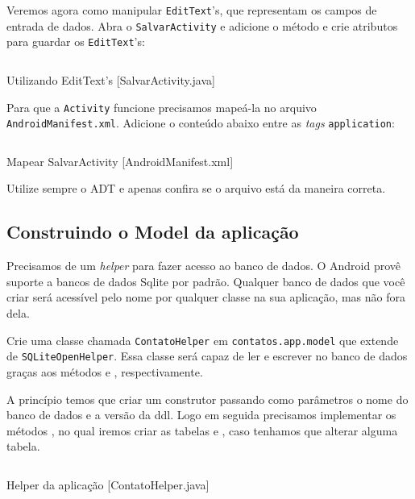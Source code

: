 Veremos agora como manipular \texttt{EditText}'s, que representam os campos de entrada de dados. Abra o
\texttt{SalvarActivity} e adicione o método  e crie atributos para guardar os \texttt{EditText}'s:

\begin{listing}[H]
  \inputminted[linenos=true,frame=bottomline,tabsize=3]{ java }{ source/SalvarActivity-1.java }
  \caption{Utilizando EditText's [SalvarActivity.java]}
\end{listing}

Para que a \texttt{Activity} funcione precisamos mapeá-la no arquivo \texttt{AndroidManifest.xml}. Adicione o
conteúdo abaixo entre as \textit{tags} \texttt{application}:

\begin{listing}[H]
  \inputminted[linenos=true,frame=bottomline,tabsize=3]{ xml }{ source/AndroidManifest-2.xml }
  \caption{Mapear SalvarActivity [AndroidManifest.xml]}
\end{listing}

Utilize sempre o ADT e apenas confira se o arquivo está da maneira correta.

\subsection{Construindo o Model da aplicação\label{ssec:model}}

Precisamos de um \textit{helper} para fazer acesso ao banco de dados. O Android provê suporte
a bancos de dados Sqlite por padrão. Qualquer banco de dados que você criar será acessível pelo nome
por qualquer classe na sua aplicação, mas não fora dela.

Crie uma classe chamada \texttt{ContatoHelper} em \texttt{contatos.app.model} que extende de
\texttt{SQLiteOpenHelper}. Essa classe será capaz de ler e escrever no banco de dados graças aos métodos 
 e , respectivamente.

A princípio temos que criar um construtor passando como parâmetros o nome do banco de dados e a versão
da \gls{ddl}. Logo em seguida precisamos implementar os métodos , no qual iremos
criar as tabelas e , caso tenhamos que alterar alguma tabela.

\begin{listing}[H]
  \inputminted[linenos=true,frame=bottomline,tabsize=3]{ java }{ source/ContatoHelper-1.java }
  \caption{Helper da aplicação [ContatoHelper.java]}
\end{listing}

